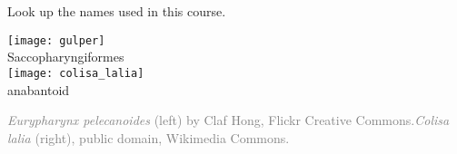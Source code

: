 \documentclass[t]{beamer}
\begin{document}
\begin{frame}[t,plain]{Look up the names used in this course.}
\begin{multicols}{2}
	\begin{center}
		\texttt{[image: gulper]} \\
		Saccopharyngiformes\\
		\columnbreak
		\texttt{[image: colisa\_lalia]} \\
		anabantoid\\
	\end{center}
\end{multicols}
	\vfilll
	\tiny\textcolor{gray}{\textit{Eurypharynx pelecanoides} (left) by Claf Hong, Flickr Creative Commons.\hfill\textit{Colisa lalia} (right), public domain, Wikimedia Commons.}
\end{frame}
\end{document}
